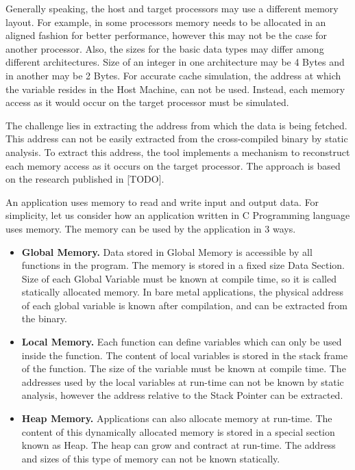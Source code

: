 Generally speaking, the host and target processors may use a different memory layout. For example, in some processors memory needs to be allocated in an aligned fashion for better performance, however this may not be the case for another processor. Also, the sizes for the basic data types may differ among different architectures. Size of an integer in one architecture may be 4 Bytes and in another may be 2 Bytes. For accurate cache simulation, the address at which the variable resides in the Host Machine, can not be used. Instead, each memory access as it would occur on the target processor must be simulated.

The challenge lies in extracting the address from which the data is being fetched. This address can not be easily extracted from the cross-compiled binary by static analysis. To extract this address, the tool implements a mechanism to reconstruct each memory access as it occurs on the target processor. The approach is based on the research published in [TODO].

An application uses memory to read and write input and output data. For simplicity, let us consider how an application written in C Programming language uses memory. The memory can be used by the application in 3 ways. 

\begin{itemize} \itemsep -6pt
\item \textbf{Global Memory.} Data stored in Global Memory is accessible by all functions in the program. The memory is stored in a fixed size Data Section. Size of each Global Variable must be known at compile time, so it is called statically allocated memory. In bare metal applications, the physical address of each global variable is known after compilation, and can be extracted from the binary.
\item \textbf{Local Memory.} Each function can define variables which can only be used inside the function. The content of local variables is stored in the stack frame of the function. The size of the variable must be known at compile time. The addresses used by the local variables at run-time can not be known by static analysis, however the address relative to the Stack Pointer can be extracted.
\item \textbf{Heap Memory.} Applications can also allocate memory at run-time. The content of this dynamically allocated memory is stored in a special section known as Heap. The heap can grow and contract at run-time. The address and sizes of this type of memory can not be known statically. 
\end{itemize}

